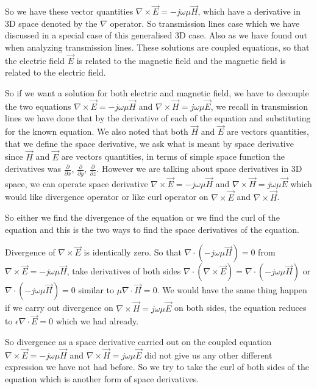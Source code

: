 So we have these vector quantities $\nabla\times\vec{E}=-j\omega\mu\vec{H}$, which have a derivative in 3D space denoted by the $\nabla$ operator. So transmission lines case which we have discussed in a special case of this generalised 3D case. Also as we have found out when analyzing transmission lines. These solutions are coupled equations, so that the electric field $\vec{E}$ is related to the magnetic field and the magnetic field is related to the electric field.

So if we want a solution for both electric and magnetic field, we have to decouple the two equations $\nabla\times\vec{E}=-j\omega\mu\vec{H}$ and $\nabla\times\vec{H}=j\omega\mu\vec{E}$, we recall in transmission lines we have done that by the derivative of each of the equation and substituting for the known equation. We also noted that both $\vec{H}$ and $\vec{E}$ are vectors quantities, that we define the space derivative, we ask what is meant by space derivative since $\vec{H}$ and $\vec{E}$ are vectors quantities, in terms of simple space function the derivatives was $\frac{\partial}{\partial x}$, $\frac{\partial}{\partial y}$, $\frac{\partial}{\partial z}$. However we are talking about space derivatives in 3D space, we can operate space derivative $\nabla\times\vec{E}=-j\omega\mu\vec{H}$ and $\nabla\times\vec{H}=j\omega\mu\vec{E}$ which would like divergence operator or like curl operator on $\nabla\times\vec{E}$ and $\nabla\times\vec{H}$. 

So either we find the divergence of the equation or we find the curl of the equation and this is the two ways to find the space derivatives of the equation.

Divergence of $\nabla\times\vec{E}$ is identically zero. So that $\nabla\cdot(-j\omega\mu\vec{H})=0$ from $\nabla\times\vec{E}=-j\omega\mu\vec{H}$, take derivatives of both sides $\nabla\cdot(\nabla\times\vec{E})=\nabla\cdot(-j\omega\mu\vec{H})$ or $\nabla\cdot(-j\omega\mu\vec{H})=0$ similar to $\mu\nabla\cdot\vec{H}=0$. We would have the same thing happen if we carry out divergence on $\nabla\times\vec{H}=j\omega\mu\vec{E}$ on both sides, the equation reduces to $\epsilon\nabla\cdot\vec{E}=0$ which we had already.

So divergence as a space derivative carried out on the coupled equation $\nabla\times\vec{E}=-j\omega\mu\vec{H}$ and $\nabla\times\vec{H}=j\omega\mu\vec{E}$ did not give us any other different expression we have not had before. So we try to take the curl of both sides of the equation which is another form of space derivatives.

